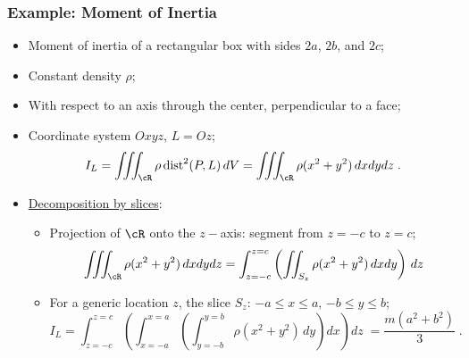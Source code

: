 \begin{frame}
  \frametitle{Example: Moment of Inertia}
  
  \begin{itemize}
    \item Moment of inertia of a rectangular box with sides $2a$, $2b$, and $2c$;
    \item Constant density $\rho$;
    \item With respect to an axis through the center, perpendicular to a face;
    \item Coordinate system $Oxyz$, $L=Oz$;
    $$I_L = \int\!\!\!\int\!\!\!\int_{\cR} \rho\, \text{dist}^2(P,L)\, dV = \int\!\!\!\int\!\!\!\int_{\cR} \rho (x^2+y^2)\, dxdydz\; .$$
    \item \underline{Decomposition by slices}:
    \begin{itemize}
    \item Projection of $\cR$ onto the $z-$axis: segment from $z=-c$ to $z=c$;
%
$$\iiint_{\cR} \rho (x^2+y^2)\, dxdydz = \int_{z=-c}^{z=c} \left( \iint_{S_z} \rho (x^2+y^2)\, dxdy \right) \, dz$$
%    
    \item For a generic location $z$, the slice $S_z$: $-a \leqslant x \leqslant a$, $-b \leqslant y \leqslant b$;
%
$$I_L = \int_{z=-c}^{z=c} \left(\int_{x=-a}^{x=a} \left( \int_{y=-b}^{y=b} \rho (x^2+y^2) \, dy \right)  dx\right)  dz\; = \frac{m(a^2+b^2)}{3} \; .$$
%

\end{itemize}
  \end{itemize}
\end{frame}